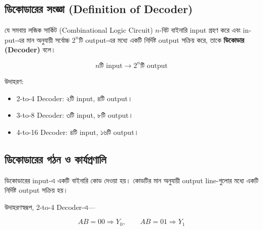 
\subsection{ডিকোডারের সংজ্ঞা
(\textenglish{Definition of Decoder})}

\par\begingroup

যে সমবায় লজিক সার্কিট
(\textenglish{Combinational Logic Circuit})
\(n\)-বিট বাইনারি \textenglish{input} গ্রহণ করে এবং
\textenglish{input}-এর মান অনুযায়ী সর্বোচ্চ \(2^n\)টি
\textenglish{output}-এর মধ্যে একটি নির্দিষ্ট
\textenglish{output} সক্রিয় করে, তাকে
\textbf{ডিকোডার (\textenglish{Decoder})} বলে।
\par\endgroup


\[
\boxed{
n\text{টি input}
\longrightarrow
2^n\text{টি output}
}
\]

উদাহরণ:

\begin{itemize}[label={{\bulletfont\textbullet}}, leftmargin=*, nosep]
\item
\textenglish{2-to-4 Decoder}:
২টি \textenglish{input}, ৪টি \textenglish{output}।

\item
\textenglish{3-to-8 Decoder}:
৩টি \textenglish{input}, ৮টি \textenglish{output}।

\item
\textenglish{4-to-16 Decoder}:
৪টি \textenglish{input}, ১৬টি \textenglish{output}।

\end{itemize}


\subsection{ডিকোডারের গঠন ও কার্যপ্রণালি}

ডিকোডারের \textenglish{input}-এ একটি বাইনারি কোড দেওয়া হয়।
কোডটির মান অনুযায়ী \textenglish{output line}-গুলোর মধ্যে
একটি নির্দিষ্ট \textenglish{output} সক্রিয় হয়।

উদাহরণস্বরূপ, \textenglish{2-to-4 Decoder}-এ—

\[
AB=00\Rightarrow Y_0,
\qquad
AB=01\Rightarrow Y_1
\]

